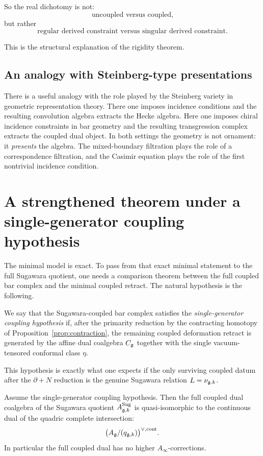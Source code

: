 So the real dichotomy is not:
\[
\text{uncoupled versus coupled,}
\]
but rather
\[
\text{regular derived constraint versus singular derived constraint.}
\]

This is the structural explanation of the rigidity theorem.

\subsection{An analogy with Steinberg-type presentations}

There is a useful analogy with the role played by the Steinberg variety in geometric representation theory. There one imposes incidence conditions and the resulting convolution algebra extracts the Hecke algebra. Here one imposes chiral incidence constraints in bar geometry and the resulting transgression complex extracts the coupled dual object. In both settings the geometry is not ornament: it \emph{presents} the algebra. The mixed-boundary filtration plays the role of a correspondence filtration, and the Casimir equation plays the role of the first nontrivial incidence condition.

\section{A strengthened theorem under a single-generator coupling hypothesis}

The minimal model is exact. To pass from that exact minimal statement to the full Sugawara quotient, one needs a comparison theorem between the full coupled bar complex and the minimal coupled retract. The natural hypothesis is the following.

\begin{definition}
We say that the Sugawara-coupled bar complex satisfies the \emph{single-generator coupling hypothesis} if, after the primarity reduction by the contracting homotopy of Proposition~\ref{prop:contraction}, the remaining coupled deformation retract is generated by the affine dual coalgebra \(C_{\mathfrak g}\) together with the single vacuum-tensored conformal class \(\eta\).
\end{definition}

This hypothesis is exactly what one expects if the only surviving coupled datum after the \(\partial+N\) reduction is the genuine Sugawara relation \(L=\nu_{\mathfrak g,k}\).

\begin{theorem}\label{thm:single-generator}
Assume the single-generator coupling hypothesis. Then the full coupled dual coalgebra of the Sugawara quotient \(A^{\mathrm{Sug}}_{\mathfrak g,k}\) is quasi-isomorphic to the continuous dual of the quadric complete intersection:
\[
\bigl(A_{\mathfrak g}/(q_{\mathfrak g,k})\bigr)^{\vee,\mathrm{cont}}.
\]
In particular the full coupled dual has no higher \(A_\infty\)-corrections.
\end{theorem}

